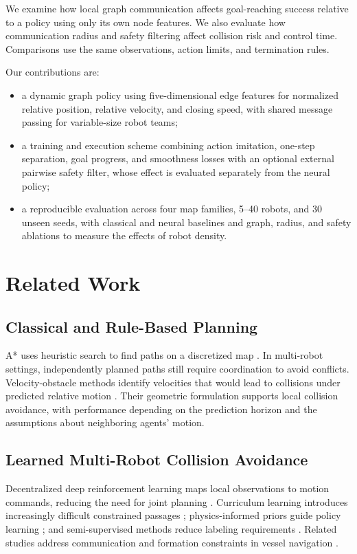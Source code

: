 \documentclass[conference]{IEEEtran}
\begin{document}
We examine how local graph communication affects goal-reaching success
relative to a policy using only its own node features. We also evaluate how
communication radius and safety filtering affect collision risk and control
time. Comparisons use the same observations, action limits, and termination
rules.

Our contributions are:
\begin{itemize}
  \item a dynamic graph policy using five-dimensional edge features for
  normalized relative position, relative velocity, and closing speed, with
  shared message passing for variable-size robot teams;
  \item a training and execution scheme combining action imitation,
  one-step separation, goal progress, and smoothness losses with an optional
  external pairwise safety filter, whose effect is evaluated separately from
  the neural policy;
  \item a reproducible evaluation across four map families, 5--40 robots, and
  30 unseen seeds, with classical and neural baselines and graph, radius, and
  safety ablations to measure the effects of robot density.
\end{itemize}

\section{Related Work}

\subsection{Classical and Rule-Based Planning}
A* uses heuristic search to find paths on a discretized map
\cite{hart1968}. In multi-robot settings, independently planned paths still
require coordination to avoid conflicts. Velocity-obstacle methods identify
velocities that would lead to collisions under predicted relative motion
\cite{fiorini1998}. Their geometric formulation supports local collision
avoidance, with performance depending on the prediction horizon and the
assumptions about neighboring agents' motion.

\subsection{Learned Multi-Robot Collision Avoidance}
Decentralized deep reinforcement learning maps local observations to motion
commands, reducing the need for joint planning
\cite{long2018orcamarl, thumiger2022uav}. Curriculum learning introduces
increasingly difficult constrained passages \cite{komol2025curriculum};
physics-informed priors guide policy learning \cite{feng2024physics}; and
semi-supervised methods reduce labeling requirements
\cite{parooei2023semisupervised}. Related studies address communication and
formation constraints in vessel navigation \cite{niu2023ship, wang2025ships}.
\end{document}
